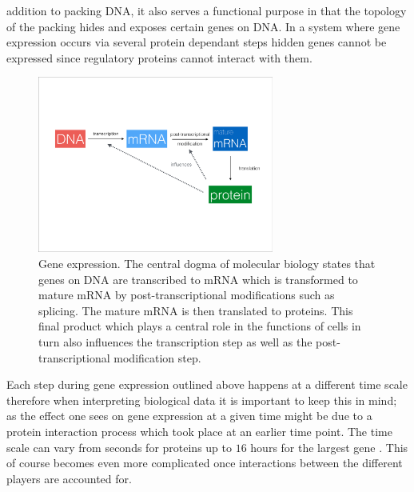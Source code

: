 addition to packing DNA, it also serves a functional purpose in that the topology of the packing hides and exposes certain genes on DNA. In a system where gene expression occurs via several protein dependant steps hidden genes cannot be expressed since regulatory proteins cannot interact with them.

\begin{figure}[!t]
  \centering
  \includegraphics[width=0.69\textwidth]{pics/dogma-bio.pdf}
  \caption{Gene expression. The central dogma of molecular biology states that genes on DNA are transcribed to mRNA which is transformed to mature mRNA by post-transcriptional modifications such as splicing. The mature mRNA is then translated to proteins. This final product which plays a central role in the functions of cells in turn also influences the transcription step as well as the post-transcriptional modification step.}
  \label{fig:gene-expression}
\end{figure}

Each step during gene expression outlined above happens at a different time scale therefore when interpreting biological data it is important to keep this in mind; as the effect one sees on gene expression at a given time might be due to a protein interaction process which took place at an earlier time point. The time scale can vary from seconds for proteins \citep{Herce:kq} up to $16$ hours for the largest gene \citep{Tennyson:1995dl}. This of course becomes even more complicated once interactions between the different players are accounted for.

